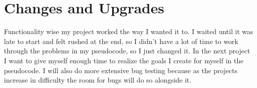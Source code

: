 \documentclass[12 pt]{report}
\begin{document}
\section{Changes and Upgrades}
\hspace{\parindent} Functionality wise my project worked the way I wanted it to. I waited until it was late to start and felt rushed at the end, so I didn’t have a lot of time to work through the problems in my pseudocode, so I just changed it. In the next project I want to give myself enough time to realize the goals I create for myself in the pseudocode. I will also do more extensive bug testing because as the projects increase in difficulty the room for bugs will do so alongside it. 
\end{document}
